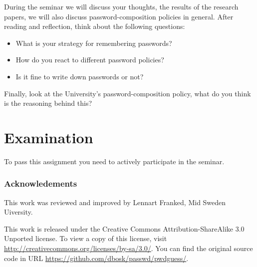 During the seminar we will discuss your thoughts, the results of the research 
papers, we will also discuss password-composition policies in general.
After reading and reflection, think about the following questions:
\begin{itemize}
  \item What is your strategy for remembering passwords?
  \item How do you react to different password policies?
  \item Is it fine to write down passwords or not?
\end{itemize}

Finally, look at the University's password-composition policy, what do you 
think is the reasoning behind this?


\section{Examination}
\label{sec:exam}
To pass this assignment you need to actively participate in the seminar.


\subsubsection*{Acknowledements}

This work was reviewed and improved by Lennart Franked, Mid Sweden Uiversity.

This work is released under the Creative Commons Attribution-ShareAlike 3.0 
Unported license.
To view a copy of this license, visit 
\url{http://creativecommons.org/licenses/by-sa/3.0/}.
You can find the original source code in URL 
\url{https://github.com/dbosk/passwd/pwdguess/}.


\printbibliography{}
